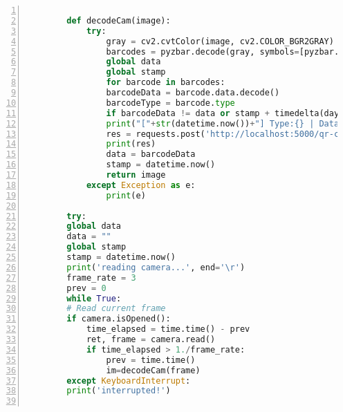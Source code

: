 \begin{enumerate}
\begin{lstlisting}[language=Python, caption={Het primaire uitvoerbare script van de QR-unit.}, label={lst:pythonPrimary}, numbers=left]
        
        def decodeCam(image):
            try:
                gray = cv2.cvtColor(image, cv2.COLOR_BGR2GRAY)
                barcodes = pyzbar.decode(gray, symbols=[pyzbar.ZBarSymbol.QRCODE])
                global data
                global stamp
                for barcode in barcodes:
                barcodeData = barcode.data.decode()
                barcodeType = barcode.type
                if barcodeData != data or stamp + timedelta(days=0, seconds=5) < datetime.now():
                print("["+str(datetime.now())+"] Type:{} | Data: {}".format(barcodeType, barcodeData))
                res = requests.post('http://localhost:5000/qr-code', json = {'tag': barcodeData })
                print(res)
                data = barcodeData
                stamp = datetime.now()
                return image
            except Exception as e:
                print(e)
        
        try:
        global data
        data = ""
        global stamp
        stamp = datetime.now()
        print('reading camera...', end='\r')
        frame_rate = 3
        prev = 0
        while True:
        # Read current frame
        if camera.isOpened():
            time_elapsed = time.time() - prev
            ret, frame = camera.read()
            if time_elapsed > 1./frame_rate:
                prev = time.time()
                im=decodeCam(frame)
        except KeyboardInterrupt:
        print('interrupted!')
        

\end{lstlisting}
\end{enumerate}
